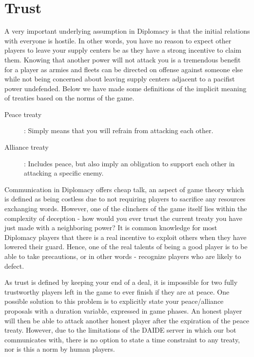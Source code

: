 \documentclass[a4paper]{article} %
\begin{document}
\section{Trust}


A very important underlying assumption in Diplomacy is that the initial relations with everyone is hostile. In other words, you have no reason to expect other players to leave your supply centers be as they have a strong incentive to claim them. Knowing that another power will not attack you is a tremendous benefit for a player as armies and fleets can be directed on offense against someone else while not being concerned about leaving supply centers adjacent to a pacifist power undefended. Below we have made some definitions of the implicit meaning of treaties based on the norms of the game.
\begin{description}
\item[Peace treaty]: Simply means that you will refrain from attacking each other.

\item[Alliance treaty]: Includes peace, but also imply an obligation to support each other in attacking a specific enemy.
\end{description}

Communication in Diplomacy offers cheap talk, an aspect of game theory which is defined as being costless due to not requiring players to sacrifice any resources exchanging words. However, one of the clinchers of the game itself lies within the complexity of deception - how would you ever trust the current treaty you have just made with a neighboring power? It is common knowledge for most Diplomacy players that there is a real incentive to exploit others when they have lowered their guard. Hence, one of the real talents of being a good player is to be able to take precautions, or in other words - recognize players who are likely to defect.

As trust is defined by keeping your end of a deal, it is impossible for two fully trustworthy players left in the game to ever finish if they are at peace. One possible solution to this problem is to explicitly state your peace/alliance proposals with a duration variable, expressed in game phases. An honest player will then be able to attack another honest player after the expiration of the peace treaty. However, due to the limitations of the DAIDE server in which our bot communicates with, there is no option to state a time constraint to any treaty, nor is this a norm by human players.
\end{document}
